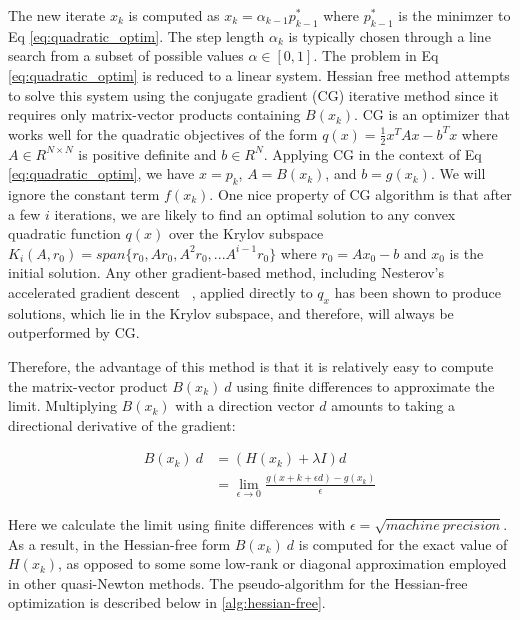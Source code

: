 \documentclass[10pt,twocolumn,letterpaper]{article}
\begin{document}
The new iterate $x_k$ is computed as $x_k = \alpha_{k-1}  p^*_{k-1}$ where $p^*_{k-1}$ is the minimzer to Eq \ref{eq:quadratic_optim}. The step length $\alpha_k$ is typically chosen through a line search from a subset of possible values $\alpha \in [0, 1]$.
The problem in Eq \ref{eq:quadratic_optim} is reduced to a linear system. Hessian free method attempts to solve this system using the conjugate gradient (CG) iterative method since it requires only matrix-vector products containing $B (x_k)$. CG is an optimizer that works well for the quadratic objectives of the form $q(x) = \frac{1}{2}x^TAx - b^T x$ where $A \in R^{N \times N}$ is positive definite and $b \in R^N$. Applying CG in the context of Eq \ref{eq:quadratic_optim}, we have $x = p_k$, $A =B(x_k) $, and $b = g(x_k)$. We will ignore the constant term $f(x_k)$. One nice property of CG algorithm is that after a few $i$ iterations, we are likely to find an optimal solution to any convex quadratic function $q(x)$ over the Krylov subspace $K_i(A, r_0) = span \{r_0, Ar_0, A^2r_0, ...  A^{i-1}r_0\}$ where $r_0 = Ax_0 − b$ and $x_0$ is the initial solution. Any other gradient-based method, including Nesterov’s accelerated gradient descent ~\cite{Nesterov83}, applied directly to $q_x$ has been shown to produce solutions, which lie in the Krylov subspace, and therefore, will always be outperformed by CG.

Therefore, the advantage of this method is that it is relatively easy to compute the matrix-vector product $B(x_k) \: d$ using finite differences to approximate the limit. Multiplying $B (x_k)$ with a direction vector $d$ amounts to taking a directional derivative of the gradient:


\begin{equation}
\begin{split}
\label{eq:quadratic_B}
B(x_k) \: d & = (H(x_k) + \lambda I) d \\
        & = \lim_{\epsilon \rightarrow 0} \frac{g(x+k + \epsilon d) - g(x_k)}{\epsilon}
\end{split}
\end{equation}

Here we calculate the limit using finite differences with $\epsilon = \sqrt{machine \: precision}$. As a result, in the Hessian-free form $B(x_k) \: d$ is computed for the exact value of $H(x_k)$, as opposed to some some low-rank or diagonal approximation employed in other quasi-Newton methods. The pseudo-algorithm for the Hessian-free optimization is described below in \ref{alg:hessian-free}.
\end{document}
